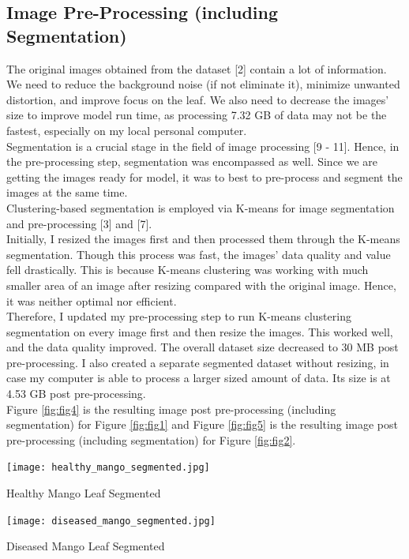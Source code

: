 \documentclass[twocolumn,10pt]{article}
\makeatletter
\newenvironment{figurehere}
  {\def\@captype{figure}}
  {}
\makeatother
\begin{document}
\begin{multicols}{2}
\begin{flushleft}
	\subsection{Image Pre-Processing (including Segmentation)}
	The original images obtained from the dataset [2] contain a lot of information. We need to reduce the background noise (if not eliminate it), minimize unwanted distortion, and improve focus on the leaf. We also need to decrease the images' size to improve model run time, as processing 7.32 GB of data may not be the fastest, especially on my local personal computer.\\
	Segmentation is a crucial stage in the field of image processing [9 - 11]. Hence, in the pre-processing step, segmentation was encompassed as well. Since we are getting the images ready for model, it was to best to pre-process and segment the images at the same time.\\
	Clustering-based segmentation is employed via K-means for image segmentation and pre-processing [3] and [7].\\
	Initially, I resized the images first and then processed them through the K-means segmentation. Though this process was fast, the images' data quality and value fell drastically. This is because K-means clustering was working with much smaller area of an image after resizing compared with the original image. Hence, it was neither optimal nor efficient.\\
	Therefore, I updated my pre-processing step to run K-means clustering segmentation on every image first and then resize the images. This worked well, and the data quality improved. The overall dataset size decreased to 30 MB post pre-processing. I also created a separate segmented dataset without resizing, in case my computer is able to process a larger sized amount of data. Its size is at 4.53 GB post pre-processing.\\
	Figure \ref{fig:fig4} is the resulting image post pre-processing (including segmentation) for Figure \ref{fig:fig1} and Figure \ref{fig:fig5} is the resulting image post pre-processing (including segmentation) for Figure \ref{fig:fig2}.

	\begin{figurehere}
		\centering
		\texttt{[image: healthy\_mango\_segmented.jpg]}
		\caption{Healthy Mango Leaf Segmented}
		\label{fig:fig4}
	\end{figurehere}
	
	\begin{figurehere}
		\centering
		\texttt{[image: diseased\_mango\_segmented.jpg]}
		\caption{Diseased Mango Leaf Segmented}
		\label{fig:fig5}
	\end{figurehere}


\end{flushleft}
\end{multicols}
\end{document}
